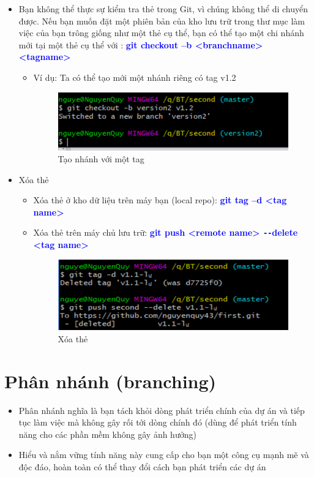 \documentclass[12pt,a4paper]{report}
\begin{document}
\begin{itemize}
\begin{itemize}
\end{itemize}

\item Bạn không thể thực sự kiểm tra thẻ trong Git, vì chúng không thể di chuyển được. Nếu bạn muốn đặt một phiên bản của kho lưu trữ trong thư mục làm việc của bạn trông giống như một thẻ cụ thể, bạn có thể tạo một chi nhánh mới tại một thẻ cụ thể với : \textcolor{blue}{\bf git checkout –b <branchname> <tagname>}
\begin{itemize}
 \item Ví dụ: Ta có thể tạo mới một nhánh riêng có tag v1.2

\begin{figure}[!ht]
	\centering
	\includegraphics[width=0.8\linewidth]{screenshot046}
\caption{Tạo nhánh với một tag}
	\label{fig:screenshot046}
\end{figure}

\end{itemize}
\item Xóa thẻ
\begin{itemize}
\item Xóa thẻ ở kho dữ liệu trên máy bạn (local repo): \textcolor{blue}{\bf  git tag –d <tag name>}
\item Xóa thẻ trên máy chủ lưu trữ: \textcolor{blue}{\bf git push <remote name> \texttt{-{}-}delete <tag name>}

\begin{figure}[!ht]
	\centering
	\includegraphics[width=0.8\linewidth]{screenshot047}
	\caption{Xóa thẻ}
	\label{fig:screenshot047}
	\end{figure}
	
\end{itemize}\end{itemize}
			
\section{Phân nhánh (branching)}
\begin{itemize}
\item Phân nhánh nghĩa là bạn tách khỏi dòng phát triển chính của dự án và tiếp tục làm việc mà không gây rối tới dòng chính đó (dùng để phát triển tính năng cho các phần mềm không gây ảnh hưởng)\vskip 0.4cm
\item Hiểu và nắm vững tính năng này cung cấp cho bạn một công cụ mạnh mẽ và độc đáo, hoàn toàn có thể thay đổi cách bạn phát triển các dự án
\end{itemize}
\end{document}
